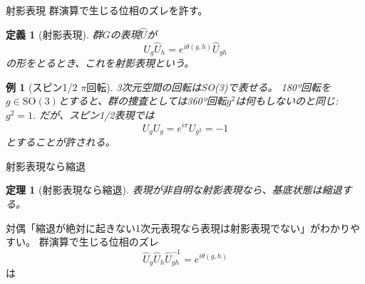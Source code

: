 \documentclass[dvipdfm]{beamer}
\newtheorem*{them}{定理}
\newtheorem*{defn}{定義}
\newtheorem*{exmpl}{例}
\begin{document}
\begin{frame}{射影表現}
    群演算で生じる位相のズレを許す。
    \begin{defn}[射影表現]
        群$G$の表現$\hat{U}$が
        \begin{equation*}
            \hat{U}_g\hat{U}_h=e^{i\theta(g,h)}\hat{U}_{gh}
        \end{equation*}
        の形をとるとき、これを射影表現という。
    \end{defn}
    \begin{exmpl}[スピン1/2 $\pi$回転]
        3次元空間の回転はSO(3)で表せる。
        180º回転を$g\in\mathrm{SO}(3)$とすると、群の捜査としては360º回転$g^2$は何もしないのと同じ:
        $g^2=1$.
        だが、スピン1/2表現では
        \begin{equation*}
            U_gU_g=e^{i\pi}U_{g^2}=-1
        \end{equation*}
        とすることが許される。
    \end{exmpl}
\end{frame}

\begin{frame}{射影表現なら縮退}
    \begin{them}[射影表現なら縮退]
        表現が非自明な射影表現なら、基底状態は縮退する。
    \end{them}
    対偶「縮退が絶対に起きない1次元表現なら表現は射影表現でない」がわかりやすい。
    群演算で生じる位相のズレ
    \begin{equation*}
        \hat{U}_g\hat{U}_h\hat{U}_{gh}^{-1}
        =
        e^{i\theta(g,h)}
    \end{equation*}
    は
\end{frame}

\end{document}
